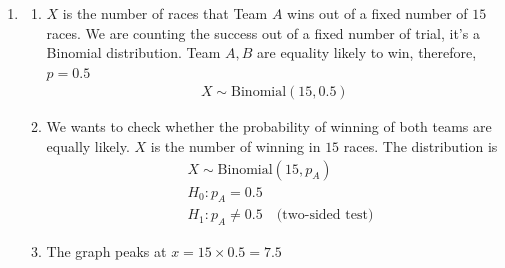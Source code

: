 \documentclass[12pt, oneside, a4paper]{article}
\begin{document}
	\begin{enumerate}
		\item \begin{enumerate}[label = (\alph*)]
			\item $X$ is the number of races that Team $A$ wins out of a fixed number of $15$ races. We are counting the success out of a fixed number of trial, it's a Binomial distribution. Team $A,B$ are equality likely to win, therefore, $p = 0.5$ \begin{align*}
				X \sim \text{Binomial}(15, 0.5)
			\end{align*}
			\item We wants to check whether the probability of winning of both teams are equally likely. $X$ is the number of winning in $15$ races. The distribution is \begin{align*}
				&X \sim \text{Binomial}(15,p_A)\\
				&H_0: p_A = 0.5 \\
				&H_1: p_A  \neq 0.5 \quad \text{(two-sided test)}
			\end{align*}
			
			\item The graph peaks at $x = 15 \times 0.5 = 7.5$
			

\end{enumerate}
\end{enumerate}
\end{document}
